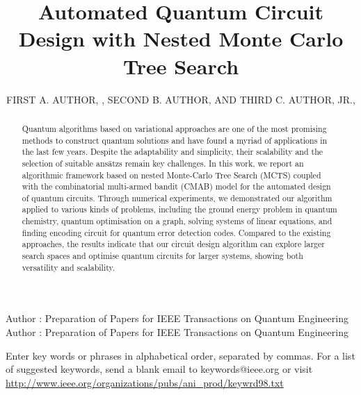 \documentclass{ieeeaccess}
\begin{document}

\title{Automated Quantum Circuit Design with Nested Monte Carlo Tree Search}
\author{\uppercase{First A. Author}, ,
\uppercase{Second B. Author, and Third C. Author,
Jr}.,
}
\address[1]{National Institute of Standards and 
Technology, Boulder, CO 80305 USA (email: author@boulder.nist.gov)}
\address[2]{Department of Physics, Colorado State University, Fort Collins, 
CO 80523 USA (email: author@lamar.colostate.edu)}
\address[3]{Electrical Engineering Department, University of Colorado, Boulder, CO 
80309 USA}

\markboth
{Author \headeretal: Preparation of Papers for IEEE Transactions on Quantum Engineering}
{Author \headeretal: Preparation of Papers for IEEE Transactions on Quantum Engineering}


\begin{abstract}
Quantum algorithms based on variational approaches are one of the most promising methods to construct quantum solutions and have found a myriad of applications in the last few years. Despite the adaptability and simplicity, their scalability and the selection of suitable ans\"atzs remain key challenges. In this work, we report an algorithmic framework based on nested Monte-Carlo Tree Search (MCTS) coupled with the combinatorial multi-armed bandit (CMAB) model  for the automated design of quantum circuits. Through numerical experiments, we demonstrated our algorithm applied to various kinds of problems, including the ground energy problem in quantum chemistry, quantum optimisation on a graph, solving  systems of linear equations, and finding encoding circuit for quantum error detection codes. Compared to the existing approaches, the results indicate that our circuit design algorithm can explore larger search spaces and optimise quantum circuits for larger systems, showing both versatility and scalability.
\end{abstract}

\begin{keywords}
Enter key words or phrases in alphabetical 
order, separated by commas. For a list of suggested keywords, send a blank 
email to keywords@ieee.org or visit \underline
{http://www.ieee.org/organizations/pubs/ani\_prod/keywrd98.txt}
\end{keywords}
\end{document}
